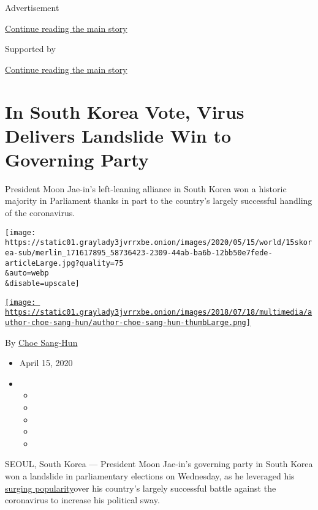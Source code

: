 Advertisement

\protect\hyperlink{after-top}{Continue reading the main story}

Supported by

\protect\hyperlink{after-sponsor}{Continue reading the main story}

\hypertarget{in-south-korea-vote-virus-delivers-landslide-win-to-governing-party}{%
\section{​In South Korea Vote, ​Virus Delivers Landslide Win to
Governing
Party}\label{in-south-korea-vote-virus-delivers-landslide-win-to-governing-party}}

President Moon Jae-in's left-leaning alliance in South Korea won a
historic majority in Parliament thanks in part to the country's largely
successful handling of the coronavirus.

\texttt{[image: https://static01.graylady3jvrrxbe.onion/images/2020/05/15/world/15skorea-sub/merlin\_171617895\_58736423-2309-44ab-ba6b-12bb50e7fede-articleLarge.jpg?quality=75\\\&auto=webp\\\&disable=upscale]}

\href{https://www.nytimes3xbfgragh.onion/by/choe-sang-hun}{\texttt{[image: https://static01.graylady3jvrrxbe.onion/images/2018/07/18/multimedia/author-choe-sang-hun/author-choe-sang-hun-thumbLarge.png]}}

By \href{https://www.nytimes3xbfgragh.onion/by/choe-sang-hun}{Choe
Sang-Hun}

\begin{itemize}
\item
  April 15, 2020
\item
  \begin{itemize}
  \item
  \item
  \item
  \item
  \item
  \end{itemize}
\end{itemize}

SEOUL, South Korea --- President Moon Jae-in's governing party in South
Korea won a landslide in parliamentary elections on Wednesday, as he
leveraged his
\href{https://www.nytimes3xbfgragh.onion/2020/04/10/world/asia/coronavirus-south-korea-election.html}{surging
popularity}over his country's largely successful battle against the
coronavirus to increase his political sway.​

